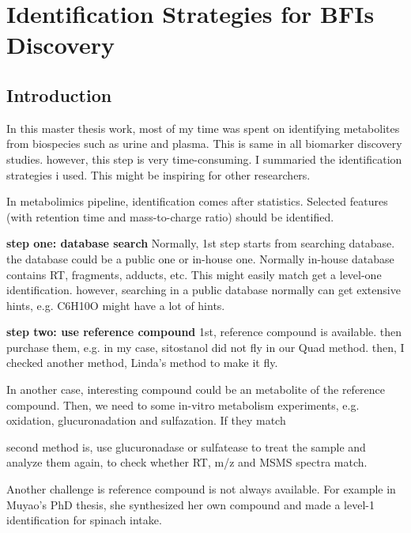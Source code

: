 \documentclass[]{report}
\begin{document}
%
\chapter{Identification Strategies for BFIs Discovery}
\section{Introduction}
In this master thesis work, most of my time was spent on identifying metabolites from biospecies such as urine and plasma. This is same in all biomarker discovery studies. however, this step is very time-consuming. I summaried the identification strategies i used. This might be inspiring for other researchers.

In metabolimics pipeline, identification comes after statistics. Selected features (with retention time and mass-to-charge ratio) should be identified. 

\textbf{step one: database search}
Normally, 1st step starts from searching database. the database could be a public one or in-house one. Normally in-house database contains RT, fragments, adducts, etc. This might easily match get a level-one identification.
however, searching in a public database normally can get extensive hints, e.g. C6H10O might have a lot of hints.

\textbf{step two: use reference compound}
1st, reference compound is available. then purchase them, e.g. in my case, sitostanol did not fly in our Quad method. then, I checked another method, Linda's method to make it fly.

In another case, interesting compound could be an metabolite of the reference compound. Then, we need to some in-vitro metabolism experiments, e.g. oxidation, glucuronadation and sulfazation. If they match 

second method is, use glucuronadase or sulfatease to treat the sample and analyze them again, to check whether RT, m/z and MSMS spectra match.

Another challenge is reference compound is not always available. For example in Muyao's PhD thesis, she synthesized her own compound and made a level-1 identification for spinach intake.
\end{document}

